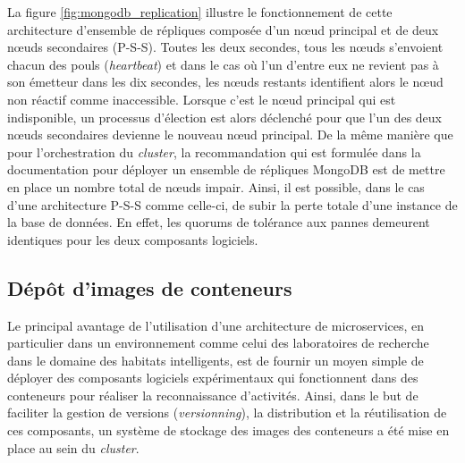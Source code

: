 La figure \ref{fig:mongodb_replication} illustre le fonctionnement de cette architecture d'ensemble de répliques composée d'un n\oe{}ud principal et de deux n\oe{}uds secondaires (P-S-S). Toutes les deux secondes, tous les n\oe{}uds s'envoient chacun des pouls (\textit{heartbeat}) et dans le cas où l'un d'entre eux ne revient pas à son émetteur dans les dix secondes, les n\oe{}uds restants identifient alors le n\oe{}ud non réactif comme inaccessible. Lorsque c'est le n\oe{}ud principal qui est indisponible, un processus d'élection est alors déclenché pour que l'un des deux n\oe{}uds secondaires devienne le nouveau n\oe{}ud principal. De la même manière que pour l'orchestration du \textit{cluster}, la recommandation qui est formulée dans la documentation pour déployer un ensemble de répliques MongoDB est de mettre en place un nombre total de n\oe{}uds impair. Ainsi, il est possible, dans le cas d'une architecture P-S-S comme celle-ci, de subir la perte totale d'une instance de la base de données. En effet, les quorums de tolérance aux pannes demeurent identiques pour les deux composants logiciels.

\subsection{Dépôt d'images de conteneurs}

Le principal avantage de l'utilisation d'une architecture de microservices, en particulier dans un environnement comme celui des laboratoires de recherche dans le domaine des habitats intelligents, est de fournir un moyen simple de déployer des composants logiciels expérimentaux qui fonctionnent dans des conteneurs pour réaliser la reconnaissance d'activités. Ainsi, dans le but de faciliter la gestion de versions (\textit{versionning}), la distribution et la réutilisation de ces composants, un système de stockage des images des conteneurs a été mise en place au sein du \textit{cluster}.


